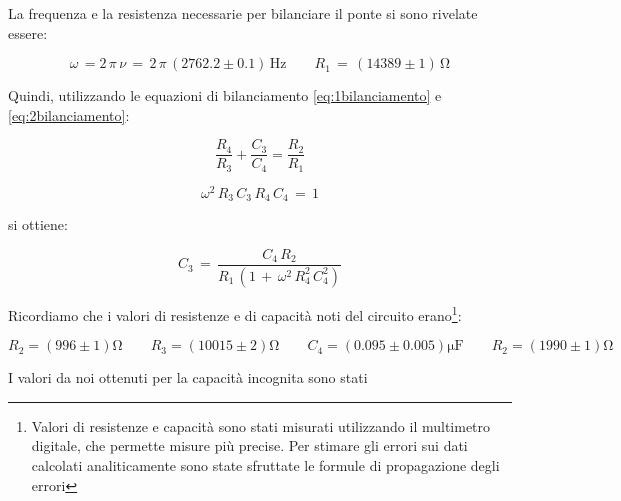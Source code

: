 La frequenza e la resistenza necessarie per bilanciare il ponte si sono rivelate essere:

\begin{equation*}
\omega \, = 2 \, \pi \, \nu \, = \, 2 \, \pi \, (2762.2 \pm 0.1) \, \si{\hertz}
\qquad R_1 \, = \, (14389 \pm 1) \, \si{\ohm}
\end{equation*}




\noindent Quindi, utilizzando le equazioni di bilanciamento \ref{eq:1bilanciamento} e \ref{eq:2bilanciamento}:\\

\noindent
\begin{minipage}{.5\linewidth}

\begin{equation}
\frac{R_4}{R_3} + \frac{C_3}{C_4} = \frac{R_2}{R_1}
\label{eq:1bilanciamento}
\end{equation}

\end{minipage}%
\begin{minipage}{.5\linewidth}

\begin{equation}
\omega^2 \, R_3 \, C_3 \, R_4 \, C_4 \, = \, 1
\label{eq:2bilanciamento}
\end{equation}

\end{minipage}

si ottiene:

\begin{equation}
C_3 \, = \, \frac{C_4 \, R_2}{R_1 \, (1 \, + \, \omega^2 \, R_4^2 \, C_4^2)}
\label{eq:C3}
\end{equation}

Ricordiamo che i valori di resistenze e di capacità noti del circuito erano\footnote{Valori di resistenze e capacità sono stati misurati utilizzando il multimetro digitale, che permette misure più precise. Per stimare gli errori sui dati calcolati analiticamente sono state sfruttate le formule di propagazione degli errori}:

\begin{equation*}
R_2=(996 \pm 1) \si{\ohm}
\qquad R_3 = (10015 \pm 2)  \si{\ohm}
\qquad C_4=(0.095 \pm 0.005 ) \si{\micro\farad}
\qquad R_2=(1990 \pm 1) \si{\ohm}
\end{equation*}

I valori da noi ottenuti per la capacità incognita sono stati\\

